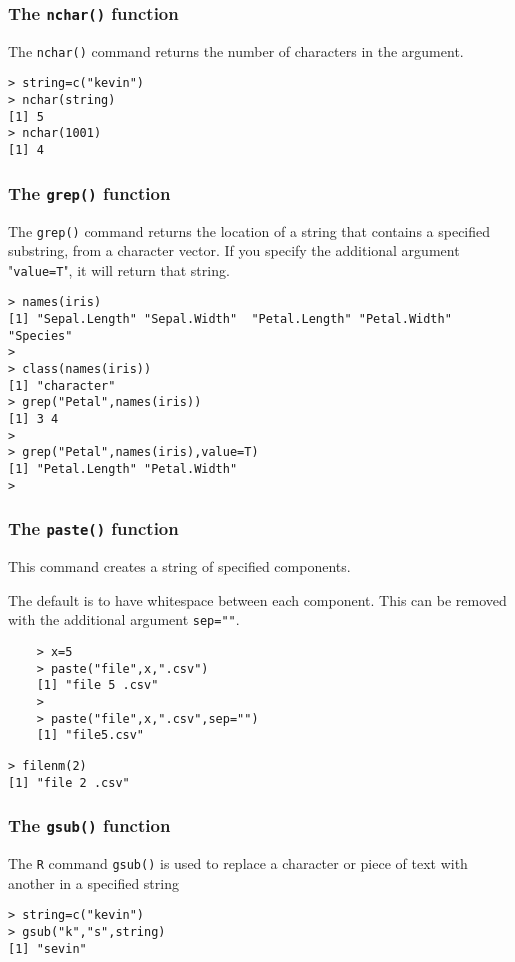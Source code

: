 \documentclass[12pt]{article}
\begin{document}
\subsubsection*{The \texttt{nchar()} function}
The \texttt{nchar()} command returns the number of characters in the argument.
\begin{verbatim}
> string=c("kevin")
> nchar(string)
[1] 5
> nchar(1001)
[1] 4
\end{verbatim}

\subsubsection*{The \texttt{grep()} function}
The \texttt{grep()} command returns the location of a string that contains a specified substring, from a character vector.
If you specify the additional argument "\texttt{value=T}", it will return that string.
\begin{verbatim}
> names(iris)
[1] "Sepal.Length" "Sepal.Width"  "Petal.Length" "Petal.Width"  "Species"     
> 
> class(names(iris))
[1] "character"
> grep("Petal",names(iris))
[1] 3 4
> 
> grep("Petal",names(iris),value=T)
[1] "Petal.Length" "Petal.Width" 
> 
\end{verbatim}
\newpage
\subsubsection*{The \texttt{paste()} function}
This command creates a string of specified components. 

\noindent The default is to have whitespace between each component. This can be removed with the additional argument \texttt{sep=""}.
\begin{framed}
	\begin{verbatim}
	> x=5
	> paste("file",x,".csv")
	[1] "file 5 .csv"
	>
	> paste("file",x,".csv",sep="")
	[1] "file5.csv"
	\end{verbatim}
\end{framed}
\begin{verbatim}
> filenm(2)
[1] "file 2 .csv"
\end{verbatim}
\subsubsection*{The \texttt{gsub()} function}
The \texttt{R} command \texttt{gsub()} is used to replace a character or piece of text with another in a specified string
\begin{verbatim}
> string=c("kevin")
> gsub("k","s",string)
[1] "sevin"
\end{verbatim}
\newpage
\end{document}
